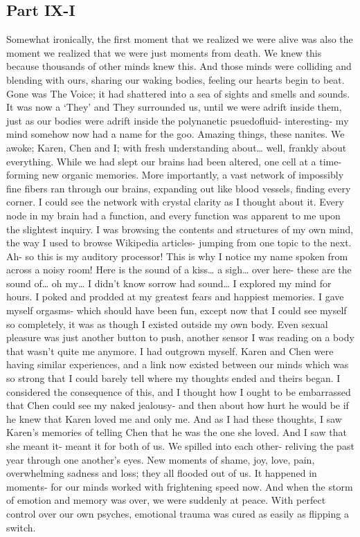 \documentclass[a4paper]{article}
\begin{document}
\subsection{Part IX-I}
Somewhat ironically, the first moment that we realized we were alive was also the moment we realized that we were just moments from death. We knew this because thousands of other minds knew this. And those minds were colliding and blending with ours, sharing our waking bodies, feeling our hearts begin to beat. Gone was The Voice; it had shattered into a sea of sights and smells and sounds. It was now a ‘They’ and They surrounded us, until we were adrift inside them, just as our bodies were adrift inside the polynanetic psuedofluid- interesting- my mind somehow now had a name for the goo.
Amazing things, these nanites. We awoke; Karen, Chen and I; with fresh understanding about… well, frankly about everything. While we had slept our brains had been altered, one cell at a time- forming new organic memories. More importantly, a vast network of impossibly fine fibers ran through our brains, expanding out like blood vessels, finding every corner. I could see the network with crystal clarity as I thought about it. Every node in my brain had a function, and every function was apparent to me upon the slightest inquiry.
I was browsing the contents and structures of my own mind, the way I used to browse Wikipedia articles- jumping from one topic to the next. Ah- so this is my auditory processor! This is why I notice my name spoken from across a noisy room! Here is the sound of a kiss… a sigh… over here- these are the sound of… oh my… I didn’t know sorrow had sound…
I explored my mind for hours. I poked and prodded at my greatest fears and happiest memories. I gave myself orgasms- which should have been fun, except now that I could see myself so completely, it was as though I existed outside my own body. Even sexual pleasure was just another button to push, another sensor I was reading on a body that wasn’t quite me anymore. I had outgrown myself.
Karen and Chen were having similar experiences, and a link now existed between our minds which was so strong that I could barely tell where my thoughts ended and theirs began. I considered the consequence of this, and I thought how I ought to be embarrassed that Chen could see my naked jealousy- and then about how hurt he would be if he knew that Karen loved me and only me. And as I had these thoughts, I saw Karen’s memories of telling Chen that he was the one she loved. And I saw that she meant it- meant it for both of us.
We spilled into each other- reliving the past year through one another’s eyes. New moments of shame, joy, love, pain, overwhelming sadness and loss; they all flooded out of us. It happened in moments- for our minds worked with frightening speed now. And when the storm of emotion and memory was over, we were suddenly at peace. With perfect control over our own psyches, emotional trauma was cured as easily as flipping a switch.
\end{document}
